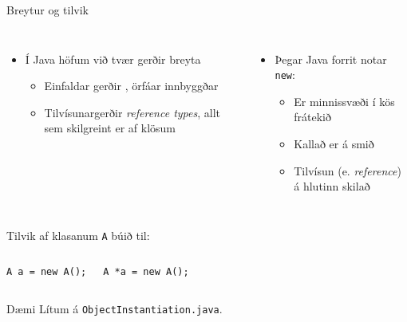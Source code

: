 \documentclass{beamer}
\begin{document}
\begin{frame}[fragile]{Breytur og tilvik}
\begin{columns}
\begin{itemize}
 \item Í Java höfum við tvær gerðir breyta
 \begin{itemize}
  \item Einfaldar gerðir , örfáar innbyggðar
  \item Tilvísunargerðir \emph{reference types}, allt sem skilgreint er af klösum
 \end{itemize}
\end{itemize}
\begin{itemize}
 \item Þegar Java forrit notar \texttt{new}:
 \begin{itemize}
  \item Er minnissvæði í kös frátekið
  \item Kallað er á smið
  \item Tilvísun (e. \emph{reference}) á hlutinn skilað
 \end{itemize}
\end{itemize}
\end{columns}
\begin{center}
Tilvik af klasanum \texttt{A} búið til:

\vspace{-0.5cm}
\end{center}
\begin{columns}
\begin{verbatim}
A a = new A();
\end{verbatim}
\begin{verbatim}
A *a = new A();
\end{verbatim}
\end{columns}
\end{frame}

\begin{frame}{Dæmi}
Lítum á \texttt{ObjectInstantiation.java}.
\end{frame}
\end{document}
